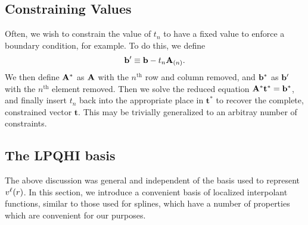 \documentclass{article}
\begin{document}
\subsection{Constraining Values}
Often, we wish to constrain the value of $t_n$ to have a fixed value
to enforce a boundary condition, for example.  To do this, we define
\begin{equation}
\mathbf{b}' \equiv \mathbf{b} - t_n \mathbf{A}_{(n)}.
\end{equation}
We then define $\mathbf{A}^*$ as $\mathbf{A}$ with the $n^\text{th}$ row and column
removed, and $\mathbf{b}^*$ as $\mathbf{b}'$ with the $n^\text{th}$ element removed.  Then
we solve the reduced equation $\mathbf{A}^* \mathbf{t}^* = \mathbf{b}^*$, and
finally insert $t_n$ back into the appropriate place in $\mathbf{t}^*$
to recover the complete, constrained vector $\mathbf{t}$.  This may be
trivially generalized to an arbitray number of constraints.
\label{sec:contraints}
\subsection{The LPQHI basis}
The above discussion was general and independent of the basis used to
represent $v^\ell(r)$.  In this section, we introduce a convenient basis
of localized interpolant functions, similar to those used for
splines, which have a number of properties which are convenient for
our purposes.  
\end{document}
